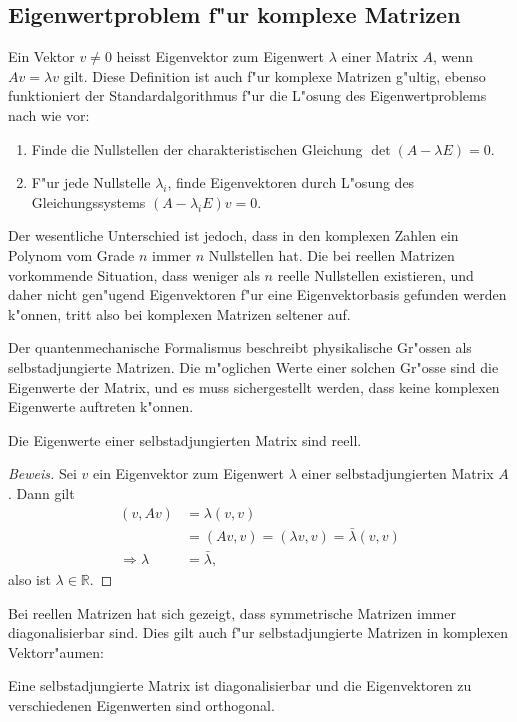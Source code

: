 \subsection{Eigenwertproblem f"ur komplexe Matrizen}
Ein Vektor $v\ne 0$ heisst Eigenvektor zum Eigenwert $\lambda$ einer
Matrix $A$, wenn $Av=\lambda v$ gilt. Diese Definition ist auch f"ur
komplexe Matrizen g"ultig, ebenso funktioniert der Standardalgorithmus
f"ur die L"osung des Eigenwertproblems nach wie vor:
\begin{enumerate}
\item Finde die Nullstellen der charakteristischen Gleichung
$\det(A-\lambda E)=0$.
\item F"ur jede Nullstelle $\lambda_i$, finde Eigenvektoren
durch L"osung des Gleichungssystems $(A-\lambda_i E)v=0$.
\end{enumerate}
Der wesentliche Unterschied ist jedoch, dass in den komplexen
Zahlen ein Polynom vom Grade $n$ immer $n$ Nullstellen hat.
Die bei reellen Matrizen vorkommende Situation, dass weniger
als $n$ reelle Nullstellen existieren, und daher nicht gen"ugend
Eigenvektoren f"ur eine Eigenvektorbasis gefunden werden k"onnen,
tritt also bei komplexen Matrizen seltener auf.

Der quantenmechanische Formalismus beschreibt physikalische Gr"ossen
als selbstadjungierte Matrizen. Die m"oglichen Werte einer solchen Gr"osse
sind die Eigenwerte der Matrix, und es muss sichergestellt werden,
dass keine komplexen Eigenwerte auftreten k"onnen.

\begin{satz}
\label{ewreell}
Die Eigenwerte einer selbstadjungierten Matrix sind reell.
\end{satz}
\begin{proof}[Beweis]
Sei $v$ ein Eigenvektor zum Eigenwert $\lambda$ einer selbstadjungierten
Matrix $A$. Dann gilt
\begin{align*}
(v,Av)
&=
\lambda(v,v)
\\
&=(Av,v)=(\lambda v,v)=\bar\lambda(v,v)
\\
\Rightarrow \lambda&=\bar\lambda,
\end{align*}
also ist $\lambda\in\mathbb R$.
\end{proof}

Bei reellen Matrizen hat sich gezeigt, dass symmetrische Matrizen immer
diagonalisierbar sind. Dies gilt auch f"ur selbstadjungierte Matrizen
in komplexen Vektorr"aumen:

\begin{satz}
Eine selbstadjungierte Matrix ist diagonalisierbar und die Eigenvektoren zu
verschiedenen Eigenwerten sind orthogonal.
\end{satz}

